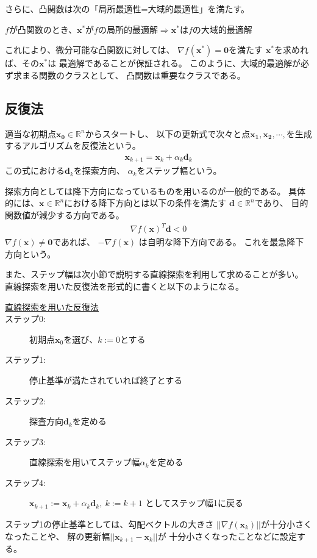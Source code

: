 \documentclass[12pt]{jarticle}
\begin{document}
\begin{description}
\begin{center}
          \end{center}
          さらに、凸関数は次の「局所最適性=大域的最適性」を満たす。
          \begin{center}
              $f$が凸関数のとき、$\boldsymbol{x}^*$が$f$の局所的最適解$\Rightarrow \boldsymbol{x}^*$は$f$の大域的最適解
          \end{center}
          これにより、微分可能な凸関数に対しては、
          $\nabla f(\boldsymbol{x}^*)=\boldsymbol{0}$を満たす
          $\boldsymbol{x}^*$を求めれば、その$\boldsymbol{x}^*$は
          最適解であることが保証される。
          このように、大域的最適解が必ず求まる関数のクラスとして、
          凸関数は重要なクラスである。
\end{description}

\clearpage
\subsection{反復法}
適当な初期点$\boldsymbol{x_0}\in \mathbb{R}^n$からスタートし、
以下の更新式で次々と点$\boldsymbol{x_1},\boldsymbol{x_2},\cdots,$を生成するアルゴリズムを反復法という。
\begin{eqnarray}
    \boldsymbol{x}_{k+1}=\boldsymbol{x}_k+\alpha_k\boldsymbol{d}_k \nonumber
\end{eqnarray}
この式における$\boldsymbol{d}_k$を探索方向、
$\alpha_k$をステップ幅という。

探索方向としては降下方向になっているものを用いるのが一般的である。
具体的には、$\boldsymbol{x} \in \mathbb{R}^n$における降下方向とは以下の条件を満たす
$\boldsymbol{d} \in \mathbb{R}^n$であり、
目的関数値が減少する方向である。
\begin{eqnarray}
    \nabla f(\boldsymbol{x})^T\boldsymbol{d} < 0 \nonumber
\end{eqnarray}
$\nabla f(\boldsymbol{x})\neq \boldsymbol{0}$であれば、
$-\nabla f(\boldsymbol{x})$
は自明な降下方向である。
これを最急降下方向という。

また、ステップ幅は次小節で説明する直線探索を利用して求めることが多い。
直線探索を用いた反復法を形式的に書くと以下のようになる。

\begin{description}
    \item[\underline{直線探索を用いた反復法}]
    \item[ステップ0:]初期点$\boldsymbol{x}_0$を選び、$k:=0$とする
    \item[ステップ1:]停止基準が満たされていれば終了とする
    \item[ステップ2:]探査方向$\boldsymbol{d}_k$を定める
    \item[ステップ3:]直線探索を用いてステップ幅$\alpha _k$を定める
    \item[ステップ4:]$\boldsymbol{x}_{k+1}:=\boldsymbol{x}_{k}+\alpha _k\boldsymbol{d}_k,\ k:=k+1$
          としてステップ幅1に戻る
\end{description}
ステップ1の停止基準としては、勾配ベクトルの大きさ
$||\nabla f(\boldsymbol{x}_k)||$が十分小さくなったことや、
解の更新幅$||\boldsymbol{x}_{k+1} - \boldsymbol{x}_k||$が
十分小さくなったことなどに設定する。
\end{document}
